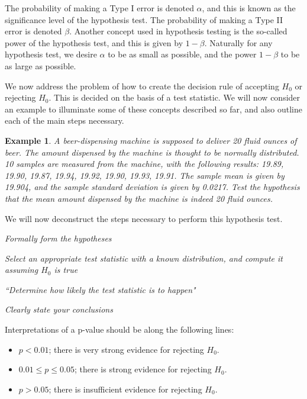\documentclass[12pt]{article}
\newtheorem{example}[theorem]{Example}
\begin{document}
The probability of making a Type I error is denoted $\alpha$, and this is known as the significance level of the hypothesis test. The probability of making a Type II error is denoted $\beta$. Another concept used in hypothesis testing is the so-called power of the hypothesis test, and this is given by $1-\beta$. Naturally for any hypothesis test, we desire $\alpha$ to be as small as possible, and the power $1-\beta$ to be as large as possible.

We now address the problem of how to create the decision rule of accepting $H_0$ or rejecting $H_0$. This is decided on the basis of a test statistic. We will now consider an example to illuminate some of these concepts described so far, and also outline each of the main steps necessary.

\begin{example}
A beer-dispensing machine is supposed to deliver 20 fluid ounces of beer. The amount dispensed by the machine is thought to be normally distributed. 10 samples are measured from the machine, with the following results: 19.89, 19.90, 19.87, 19.94, 19.92, 19.90, 19.93, 19.91. The sample mean is given by 19.904, and the sample standard deviation is given by 0.0217. Test the hypothesis that the mean amount dispensed by the machine is indeed 20 fluid ounces.
\end{example}

We will now deconstruct the steps necessary to perform this hypothesis test.

\begin{mdframed}
\it{Formally form the hypotheses}
\textcolor[rgb]{1.00,1.00,1.00}{\lipsum[1]}
\end{mdframed}

\begin{mdframed}
\it{Select an appropriate test statistic with a known distribution, and compute it assuming $H_0$ is true}
\textcolor[rgb]{1.00,1.00,1.00}{\lipsum[1]}
\end{mdframed}

\begin{mdframed}
\it{``Determine how likely the test statistic is to happen"}
\textcolor[rgb]{1.00,1.00,1.00}{\lipsum[1-6]}
\end{mdframed}

\begin{mdframed}
\it{Clearly state your conclusions}
\textcolor[rgb]{1.00,1.00,1.00}{\lipsum[1]}
\end{mdframed}

Interpretations of a
p-value should be along the following
lines:
\begin{itemize}
\item $p < 0.01$; there is very strong evidence
for rejecting $H_{0}$.
\item $0.01 \leq p \leq 0.05$; there is strong evidence
for rejecting $H_0$.
\item $p > 0.05$; there is insufficient evidence
for rejecting $H_0$.
\end{itemize}
\end{document}

